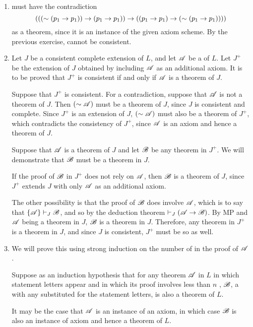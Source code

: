 \begin{enumerate}

  \item %
    \Lpp{} must have the contradiction
    \[(((\sim(p_1 \rightarrow p_1)) \rightarrow (p_1 \rightarrow p_1)) \rightarrow ((p_1 \rightarrow p_1) \rightarrow (\sim (p_1 \rightarrow p_1))))\]
    as a theorem, since it is an instance of the given axiom scheme. By the previous exercise, \Lpp{} cannot be consistent.

  \item %
    Let \(J\) be a consistent complete extension of \(L\), and let \(\mathscr{A}\) be a \wf{} of \(L\). Let \(J^+\) be the extension of \(J\) obtained by including \(\mathscr{A}\) as an additional axiom. It is to be proved that \(J^+\) is consistent if and only if \(\mathscr{A}\) is a theorem of \(J\).

    \Ra{} Suppose that \(J^+\) is consistent. For a contradiction, suppose that \(\mathscr{A}\) is not a theorem of \(J\). Then \((\sim\mathscr{A})\) must be a theorem of \(J\), since \(J\) is consistent and complete. Since \(J^+\) is an extension of \(J\), \((\sim\mathscr{A})\) must also be a theorem of \(J^+\), which contradicts the consistency of \(J^+\), since \(\mathscr{A}\) is an axiom and hence a theorem of \(J\).

    \La{} Suppose that \(\mathscr{A}\) is a theorem of \(J\) and let \(\mathscr{B}\) be any theorem in \(J^+\). We will demonstrate that \(\mathscr{B}\) must be a theorem in \(J\).

    If the proof of \(\mathscr{B}\) in \(J^+\) does not rely on \(\mathscr{A}\), then \(\mathscr{B}\) is a theorem of \(J\), since \(J^+\) extends \(J\) with only \(\mathscr{A}\) as an additional axiom.

    The other possibility is that the proof of \(\mathscr{B}\) does involve \(\mathscr{A}\), which is to say that \(\{\mathscr{A}\} \vdash_{J} \mathscr{B}\), and so by the deduction theorem \(\vdash_{J} (\mathscr{A} \rightarrow \mathscr{B})\). By MP and \(\mathscr{A}\) being a theorem in \(J\), \(\mathscr{B}\) is a theorem in \(J\). Therefore, any theorem in \(J^+\) is a theorem in \(J\), and since \(J\) is consistent, \(J^+\) must be so as well.

  \item %
    We will prove this using strong induction on the number of \wfs{} in the proof of \(\mathscr{A}\).

    Suppose as an induction hypothesis that for any theorem \(\mathscr{A}\) in \(L\) in which statement letters appear and in which its proof involves less than \(n\) \wfs{}, \(\mathscr{B}\), a \wf{} with any \wfs{} substituted for the statement letters, is also a theorem of \(L\).

    It may be the case that \(\mathscr{A}\) is an instance of an axiom, in which case \(\mathscr{B}\) is also an instance of axiom and hence a theorem of \(L\).


\end{enumerate}
